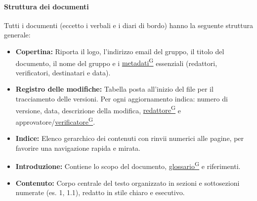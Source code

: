\documentclass[a4paper,12pt]{article}
\providecommand{\glslink}[2]{\href{https://alittlebyte-19.github.io/Documentazione/glossario.html\#gls-#1}{\underline{#2}\textsuperscript{\scriptsize G}}}
\begin{document}
\paragraph{Struttura dei documenti}
Tutti i documenti (eccetto i verbali e i diari di bordo) hanno la seguente struttura generale: 
\begin{itemize}
    \item \textbf{Copertina:} Riporta il logo, l'indirizzo email del gruppo, il titolo del documento, il nome del gruppo e i \glslink{metadati}{metadati} essenziali (redattori, verificatori, destinatari e data).
    \item \textbf{Registro delle modifiche:} Tabella posta all'inizio del file per il tracciamento delle versioni. Per ogni aggiornamento indica: numero di versione, data, descrizione della modifica, \glslink{redattore}{redattore} e approvatore/\glslink{verificatore}{verificatore}.
    \item \textbf{Indice:} Elenco gerarchico dei contenuti con rinvii numerici alle pagine, per favorire una navigazione rapida e mirata.
    \item \textbf{Introduzione:} Contiene lo scopo del documento, \glslink{glossario}{glossario} e riferimenti. 
    \item \textbf{Contenuto:} Corpo centrale del testo organizzato in sezioni e sottosezioni numerate (es. 1, 1.1), redatto in stile chiaro e esecutivo.
\end{itemize}
\end{document}
